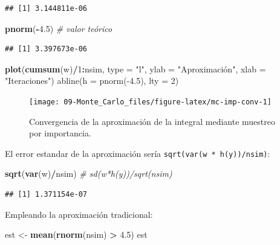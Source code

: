\documentclass[
]{book}
\newenvironment{Shaded}{\begin{snugshade}}{\end{snugshade}}
\newcommand{\CommentTok}[1]{\textcolor[rgb]{0.56,0.35,0.01}{\textit{#1}}}
\newcommand{\DataTypeTok}[1]{\textcolor[rgb]{0.13,0.29,0.53}{#1}}
\newcommand{\DecValTok}[1]{\textcolor[rgb]{0.00,0.00,0.81}{#1}}
\newcommand{\FloatTok}[1]{\textcolor[rgb]{0.00,0.00,0.81}{#1}}
\newcommand{\KeywordTok}[1]{\textcolor[rgb]{0.13,0.29,0.53}{\textbf{#1}}}
\newcommand{\NormalTok}[1]{#1}
\newcommand{\OperatorTok}[1]{\textcolor[rgb]{0.81,0.36,0.00}{\textbf{#1}}}
\newcommand{\StringTok}[1]{\textcolor[rgb]{0.31,0.60,0.02}{#1}}
\theoremstyle{break}
\theoremstyle{definition}
\theoremstyle{definition}
\theoremstyle{definition}
\theoremstyle{remark}
\begin{document}
\begin{verbatim}
## [1] 3.144811e-06
\end{verbatim}

\begin{Shaded}
\begin{Highlighting}[]
\KeywordTok{pnorm}\NormalTok{(}\OperatorTok{-}\FloatTok{4.5}\NormalTok{)  }\CommentTok{# valor teórico}
\end{Highlighting}
\end{Shaded}

\begin{verbatim}
## [1] 3.397673e-06
\end{verbatim}

\begin{Shaded}
\begin{Highlighting}[]
\KeywordTok{plot}\NormalTok{(}\KeywordTok{cumsum}\NormalTok{(w)}\OperatorTok{/}\DecValTok{1}\OperatorTok{:}\NormalTok{nsim, }\DataTypeTok{type =} \StringTok{"l"}\NormalTok{, }\DataTypeTok{ylab =} \StringTok{"Aproximación", xlab = "}\NormalTok{Iteraciones}\StringTok{")}
\StringTok{abline(h = pnorm(-4.5), lty = 2)}
\end{Highlighting}
\end{Shaded}

\begin{figure}[!htb]

{\centering \texttt{[image: 09-Monte\_Carlo\_files/figure-latex/mc-imp-conv-1]} 

}

\caption{Convergencia de la aproximación de la integral mediante muestreo por importancia.}\label{fig:mc-imp-conv}
\end{figure}

El error estandar de la aproximación sería \texttt{sqrt(var(w\ *\ h(y))/nsim)}:

\begin{Shaded}
\begin{Highlighting}[]
\KeywordTok{sqrt}\NormalTok{(}\KeywordTok{var}\NormalTok{(w)}\OperatorTok{/}\NormalTok{nsim) }\CommentTok{# sd(w*h(y))/sqrt(nsim)   }
\end{Highlighting}
\end{Shaded}

\begin{verbatim}
## [1] 1.371154e-07
\end{verbatim}

Empleando la aproximación tradicional:

\begin{Shaded}
\begin{Highlighting}[]
\NormalTok{est <-}\StringTok{ }\KeywordTok{mean}\NormalTok{(}\KeywordTok{rnorm}\NormalTok{(nsim) }\OperatorTok{>}\StringTok{ }\FloatTok{4.5}\NormalTok{)}
\NormalTok{est}
\end{Highlighting}
\end{Shaded}
\end{document}
